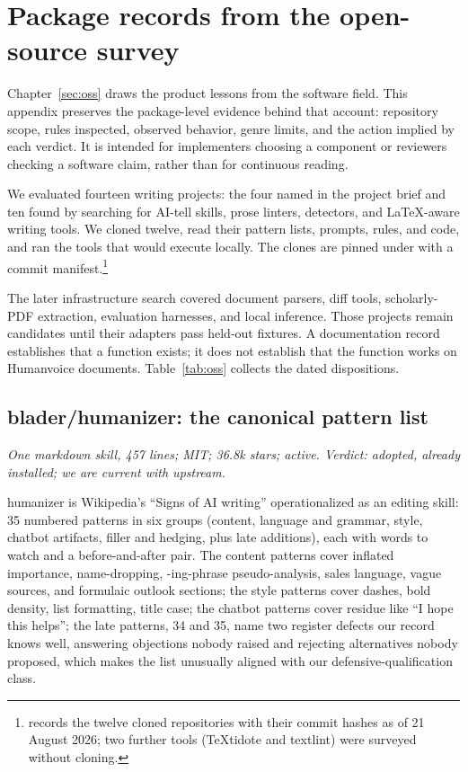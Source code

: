 \chapter{Package records from the open-source survey}
\label{app:oss-records}

Chapter~\ref{sec:oss} draws the product lessons from the software field. This
appendix preserves the package-level evidence behind that account: repository
scope, rules inspected, observed behavior, genre limits, and the action implied
by each verdict. It is intended for implementers choosing a component or
reviewers checking a software claim, rather than for continuous reading.

We evaluated fourteen writing projects: the four named in the project brief
and ten found by searching for AI-tell skills, prose linters, detectors, and
LaTeX-aware writing tools. We cloned twelve, read their pattern lists, prompts,
rules, and code, and ran the tools that would execute locally. The clones are
pinned under  with a commit
manifest.\footnote{ records the twelve
cloned repositories with their commit hashes as of 21 August 2026; two further
tools (TeXtidote and textlint) were surveyed without cloning.}

The later infrastructure search covered document parsers, diff tools,
scholarly-PDF extraction, evaluation harnesses, and local inference. Those
projects remain candidates until their adapters pass held-out fixtures. A
documentation record establishes that a function exists; it does not establish
that the function works on Humanvoice documents. Table~\ref{tab:oss} collects
the dated dispositions.

\section{blader/humanizer: the canonical pattern list}
\label{app:oss-humanizer-record}

\emph{One markdown skill, 457 lines; MIT; 36.8k stars; active. Verdict:
adopted, already installed; we are current with upstream.}

humanizer is Wikipedia's ``Signs of AI writing'' operationalized as an
editing skill: 35 numbered patterns in six groups (content, language and
grammar, style, chatbot artifacts, filler and hedging, plus late additions),
each with words to watch and a before-and-after pair. The content patterns
cover inflated importance, name-dropping, \mbox{-ing}-phrase pseudo-analysis,
sales language, vague sources, and formulaic outlook sections; the style
patterns cover dashes, bold density, list formatting, title case; the
chatbot patterns cover residue like ``I hope this helps''; the late
patterns, 34 and 35, name two register defects our record knows well,
answering objections nobody raised and rejecting alternatives nobody
proposed, which makes the list unusually aligned with our
defensive-qualification class.

